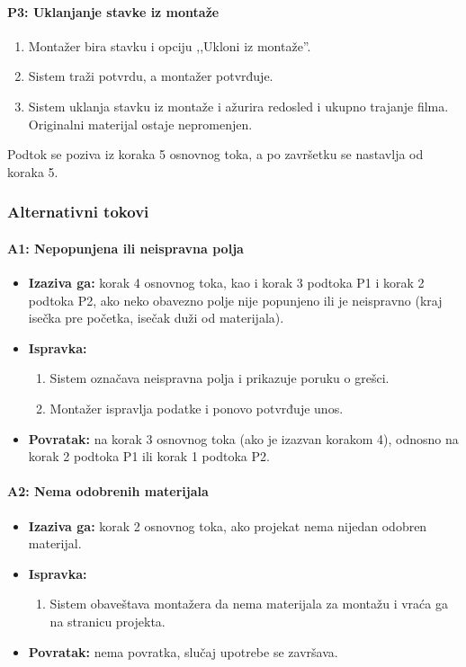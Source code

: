 \paragraph*{P3: Uklanjanje stavke iz montaže}
\begin{enumerate}
    \item Montažer bira stavku i opciju ,,Ukloni iz montaže''.
    \item Sistem traži potvrdu, a montažer potvrđuje.
    \item Sistem uklanja stavku iz montaže i ažurira redosled i ukupno trajanje filma. Originalni materijal ostaje nepromenjen.
\end{enumerate}
Podtok se poziva iz koraka 5 osnovnog toka, a po završetku se nastavlja od koraka 5.

\subsubsection*{Alternativni tokovi}

\paragraph*{A1: Nepopunjena ili neispravna polja}
\begin{itemize}
    \item \textbf{Izaziva ga:} korak 4 osnovnog toka, kao i korak 3 podtoka P1 i korak 2 podtoka P2, ako neko obavezno polje nije popunjeno ili je neispravno (kraj isečka pre početka, isečak duži od materijala).
    \item \textbf{Ispravka:}
    \begin{enumerate}
        \item Sistem označava neispravna polja i prikazuje poruku o grešci.
        \item Montažer ispravlja podatke i ponovo potvrđuje unos.
    \end{enumerate}
    \item \textbf{Povratak:} na korak 3 osnovnog toka (ako je izazvan korakom 4), odnosno na korak 2 podtoka P1 ili korak 1 podtoka P2.
\end{itemize}

\paragraph*{A2: Nema odobrenih materijala}
\begin{itemize}
    \item \textbf{Izaziva ga:} korak 2 osnovnog toka, ako projekat nema nijedan odobren materijal.
    \item \textbf{Ispravka:}
    \begin{enumerate}
        \item Sistem obaveštava montažera da nema materijala za montažu i vraća ga na stranicu projekta.
    \end{enumerate}
    \item \textbf{Povratak:} nema povratka, slučaj upotrebe se završava.
\end{itemize}

